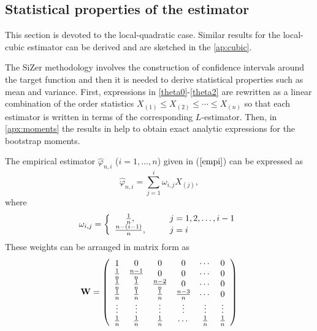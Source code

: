 \documentclass[preprint,12pt]{elsarticle}
\begin{document}
\subsection{Statistical properties of the estimator}\label{stat_prop}
This section is devoted to the local-quadratic case. Similar results for the local-cubic estimator can be derived and are sketched in the \ref{ap:cubic}.

The SiZer methodology involves the construction of confidence intervals around the target function and then it is needed to derive statistical properties such as mean and variance. First, expressions in \eqref{theta0}-\eqref{theta2} are rewritten as a linear combination of the order statistics $X_{(1)} \leq X_{(2)} \leq \cdots \leq X_{(n)}$ so that each estimator is written in terms of the corresponding $L$-estimator. Then, in \ref{apx:moments} the results in \cite{HE2000} help to obtain exact analytic expressions for the bootstrap moments.
 
The empirical estimator $\widehat{\varphi}_{n,i}$ ($i=1,\ldots,n$) given in ($\ref{empi}$) can be expressed as
\begin{equation}\label{empi_2}
\widehat{\varphi}_{n,i}=\sum_{j=1}^i\omega_{i,j} X_{(j)},
\end{equation}
where
\begin{equation}\label{eq:omega}
\omega_{i,j}=\left\{\begin{array}{cll} 
\frac{1}{n}, & \hspace{0.3cm}& j= 1,2, \ldots, i-1 \\
\frac{n-(i-1)}{n},& \hspace{0.3cm}& j= i \\
\end{array}\right.
\end{equation}
These weights can be arranged in matrix form  as 
\[
{\bf W} =\left(
\begin{array}{cccccc}
1 & 0 &0 &0& \cdots &0 \\
\frac{1}{n} & \frac{n-1}{n}&0&0&\cdots& 0 \\
\frac{1}{n} & \frac{1}{n}&\frac{n-2}{n}&0&\cdots& 0 \\
\frac{1}{n} & \frac{1}{n}&\frac{1}{n}&\frac{n-3}{n}&\cdots& 0 \\
\vdots&\vdots&\vdots&\vdots&\vdots&\vdots \\
\frac{1}{n} & \frac{1}{n}&\frac{1}{n}&\cdots&\frac{1}{n}& \frac{1}{n} \\
\end{array}
\right)
\]
\end{document}
